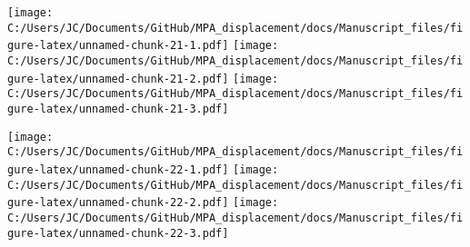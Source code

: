 \documentclass[11pt,]{article}
\begin{document}
\texttt{[image: C:/Users/JC/Documents/GitHub/MPA\_displacement/docs/Manuscript\_files/figure-latex/unnamed-chunk-21-1.pdf]}
\texttt{[image: C:/Users/JC/Documents/GitHub/MPA\_displacement/docs/Manuscript\_files/figure-latex/unnamed-chunk-21-2.pdf]}
\texttt{[image: C:/Users/JC/Documents/GitHub/MPA\_displacement/docs/Manuscript\_files/figure-latex/unnamed-chunk-21-3.pdf]}

\texttt{[image: C:/Users/JC/Documents/GitHub/MPA\_displacement/docs/Manuscript\_files/figure-latex/unnamed-chunk-22-1.pdf]}
\texttt{[image: C:/Users/JC/Documents/GitHub/MPA\_displacement/docs/Manuscript\_files/figure-latex/unnamed-chunk-22-2.pdf]}
\texttt{[image: C:/Users/JC/Documents/GitHub/MPA\_displacement/docs/Manuscript\_files/figure-latex/unnamed-chunk-22-3.pdf]}

\clearpage


\end{document}
